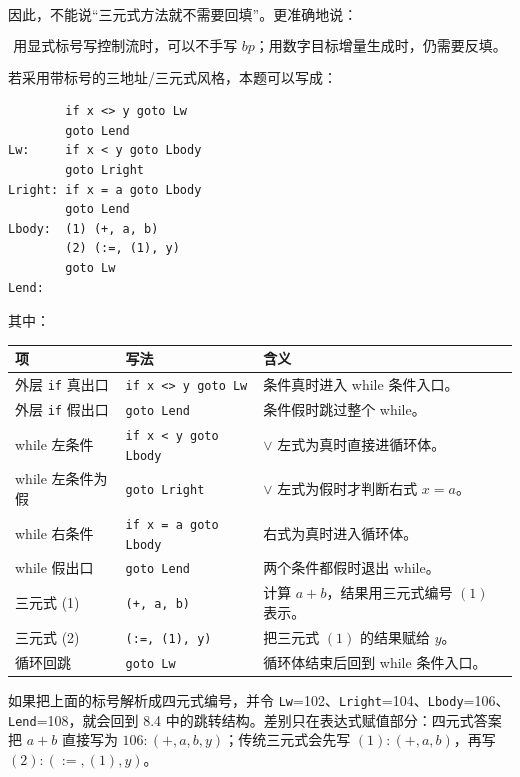 \documentclass[UTF8,zihao=-4]{ctexart}
\newcommand{\kw}[1]{\texttt{#1}}
\begin{document}
因此，不能说“三元式方法就不需要回填”。更准确地说：

\[
\boxed{\text{用显式标号写控制流时，可以不手写 }bp\text{；用数字目标增量生成时，仍需要反填。}}
\]

若采用带标号的三地址/三元式风格，本题可以写成：

\begin{lstlisting}
        if x <> y goto Lw
        goto Lend
Lw:     if x < y goto Lbody
        goto Lright
Lright: if x = a goto Lbody
        goto Lend
Lbody:  (1) (+, a, b)
        (2) (:=, (1), y)
        goto Lw
Lend:
\end{lstlisting}

其中：

\begin{center}
\small
\begin{tabular}{L{0.18\textwidth}|L{0.28\textwidth}|L{0.42\textwidth}}
项 & 写法 & 含义\\
\hline
外层 \kw{if} 真出口 & \kw{if x <> y goto Lw} & 条件真时进入 while 条件入口。\\
外层 \kw{if} 假出口 & \kw{goto Lend} & 条件假时跳过整个 while。\\
while 左条件 & \kw{if x < y goto Lbody} & $\lor$ 左式为真时直接进循环体。\\
while 左条件为假 & \kw{goto Lright} & $\lor$ 左式为假时才判断右式 $x=a$。\\
while 右条件 & \kw{if x = a goto Lbody} & 右式为真时进入循环体。\\
while 假出口 & \kw{goto Lend} & 两个条件都假时退出 while。\\
三元式 (1) & \kw{(+, a, b)} & 计算 $a+b$，结果用三元式编号 $(1)$ 表示。\\
三元式 (2) & \kw{(:=, (1), y)} & 把三元式 $(1)$ 的结果赋给 $y$。\\
循环回跳 & \kw{goto Lw} & 循环体结束后回到 while 条件入口。\\
\end{tabular}
\normalsize
\end{center}

如果把上面的标号解析成四元式编号，并令 \kw{Lw}=102、\kw{Lright}=104、\kw{Lbody}=106、\kw{Lend}=108，就会回到 8.4 中的跳转结构。差别只在表达式赋值部分：四元式答案把 $a+b$ 直接写为 $106:(+,a,b,y)$；传统三元式会先写 $(1):(+ ,a,b)$，再写 $(2):(:=,(1),y)$。
\end{document}
